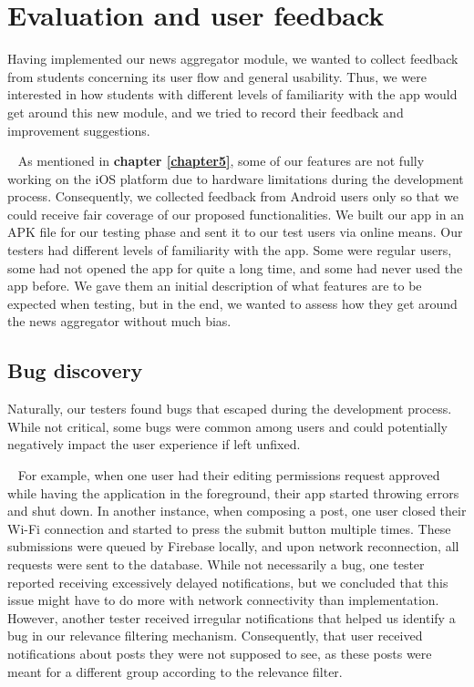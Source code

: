 \chapter{Evaluation and user feedback} \label{chapter6}

Having implemented our news aggregator module, we wanted to collect feedback from students concerning its user flow and general usability. Thus, we were interested in how students with different levels of familiarity with the app would get around this new module, and we tried to record their feedback and improvement suggestions. 

~
As mentioned in \textbf{chapter \ref{chapter5}}, some of our features are not fully working on the iOS platform due to hardware limitations during the development process. Consequently, we collected feedback from Android users only so that we could receive fair coverage of our proposed functionalities. We built our app in an APK file for our testing phase and sent it to our test users via online means. Our testers had different levels of familiarity with the app. Some were regular users, some had not opened the app for quite a long time, and some had never used the app before. We gave them an initial description of what features are to be expected when testing, but in the end, we wanted to assess how they get around the news aggregator without much bias.

\section{Bug discovery}

Naturally, our testers found bugs that escaped during the development process. While not critical, some bugs were common among users and could potentially negatively impact the user experience if left unfixed.

~
For example, when one user had their editing permissions request approved while having the application in the foreground, their app started throwing errors and shut down. In another instance, when composing a post, one user closed their Wi-Fi connection and started to press the submit button multiple times. These submissions were queued by Firebase locally, and upon network reconnection, all requests were sent to the database. While not necessarily a bug, one tester reported receiving excessively delayed notifications, but we concluded that this issue might have to do more with network connectivity than implementation. However, another tester received irregular notifications that helped us identify a bug in our relevance filtering mechanism. Consequently, that user received notifications about posts they were not supposed to see, as these posts were meant for a different group according to the relevance filter.

